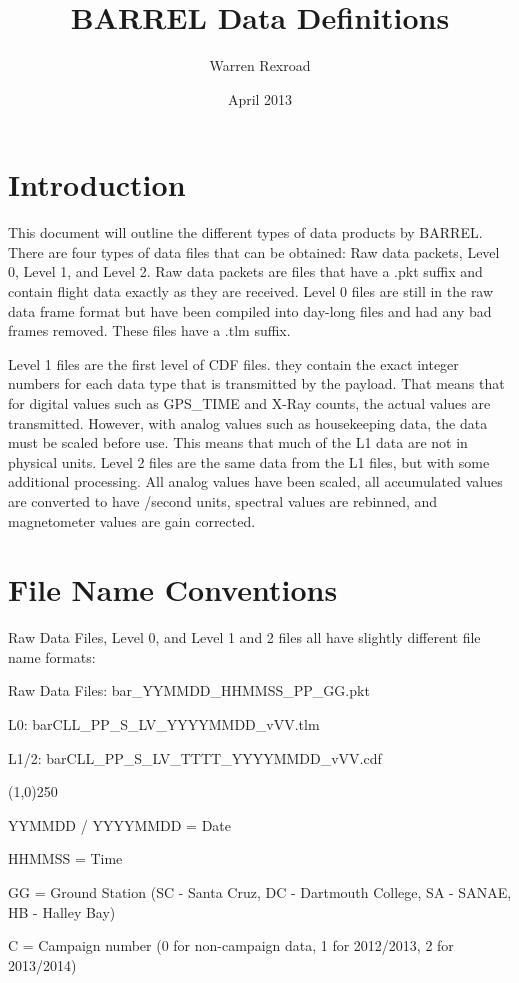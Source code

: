 \documentclass{article}
\title{BARREL Data Definitions}
\author{Warren Rexroad}
\date{April 2013}
\begin{document}
\maketitle

\section{Introduction}
This document will outline the different types of data products by BARREL. There are four types of data files that can be obtained: Raw data packets, Level 0, Level 1, and Level 2. Raw data packets are files that have a .pkt suffix and contain flight data exactly as they are received. Level 0 files are still in the raw data frame format but have been compiled into day-long files and had any bad frames removed. These files have a .tlm suffix.

Level 1 files are the first level of CDF files. they contain the exact integer numbers for each data type that is transmitted by the payload. That means that for digital values such as GPS\_TIME and X-Ray counts, the actual values are transmitted. However, with analog values such as housekeeping data, the data must be scaled before use. This means that much of the L1 data are not in physical units. Level 2 files are the same data from the L1 files, but with some additional processing. All analog values have been scaled, all accumulated values are converted to have /second units, spectral values are rebinned, and magnetometer values are gain corrected.

\section{File Name Conventions}
Raw Data Files, Level 0, and Level 1 and 2 files all have slightly different file name formats:

Raw Data Files: bar\_YYMMDD\_HHMMSS\_PP\_GG.pkt

L0: barCLL\_PP\_S\_LV\_YYYYMMDD\_vVV.tlm

L1/2: barCLL\_PP\_S\_LV\_TTTT\_YYYYMMDD\_vVV.cdf

\begin{center}
\line(1,0){250}
\end{center}

YYMMDD / YYYYMMDD = Date

HHMMSS = Time

GG = Ground Station (SC - Santa Cruz, DC - Dartmouth College, SA - SANAE, HB - Halley Bay)

C = Campaign number (0 for non-campaign data, 1 for 2012/2013, 2 for 2013/2014)
\end{document}
